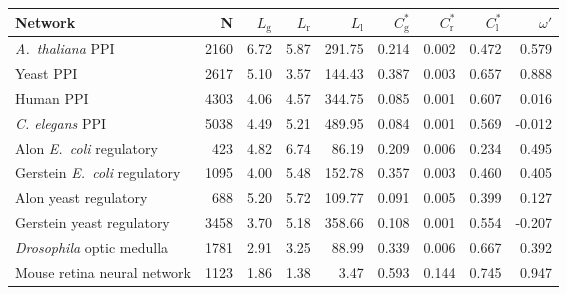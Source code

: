 \begin{tabular}{lrrrrrrrr}
\hline
Network & N  & $L_{\mathrm{g}}$ & $L_{\mathrm{r}}$ & $L_{\mathrm{l}}$ & $C^\ast_{\mathrm{g}}$ & $C^\ast_{\mathrm{r}}$ & $C^\ast_{\mathrm{l}}$ &  $\omega'$ \\
\hline
\textit{A.~thaliana} PPI & 2160 & 6.72 & 5.87 & 291.75 & 0.214 & 0.002 & 0.472 & 0.579\\
Yeast PPI & 2617 & 5.10 & 3.57 & 144.43 & 0.387 & 0.003 & 0.657 & 0.888\\
Human PPI & 4303 & 4.06 & 4.57 & 344.75 & 0.085 & 0.001 & 0.607 & 0.016\\
\textit{C. elegans} PPI & 5038 & 4.49 & 5.21 & 489.95 & 0.084 & 0.001 & 0.569 & -0.012\\
Alon \textit{E.~coli} regulatory & 423 & 4.82 & 6.74 & 86.19 & 0.209 & 0.006 & 0.234 & 0.495\\
Gerstein \textit{E.~coli} regulatory & 1095 & 4.00 & 5.48 & 152.78 & 0.357 & 0.003 & 0.460 & 0.405\\
Alon yeast regulatory & 688 & 5.20 & 5.72 & 109.77 & 0.091 & 0.005 & 0.399 & 0.127\\
Gerstein yeast regulatory & 3458 & 3.70 & 5.18 & 358.66 & 0.108 & 0.001 & 0.554 & -0.207\\
\textit{Drosophila} optic medulla & 1781 & 2.91 & 3.25 & 88.99 & 0.339 & 0.006 & 0.667 & 0.392\\
Mouse retina neural network & 1123 & 1.86 & 1.38 & 3.47 & 0.593 & 0.144 & 0.745 & 0.947\\
\hline
\end{tabular}
